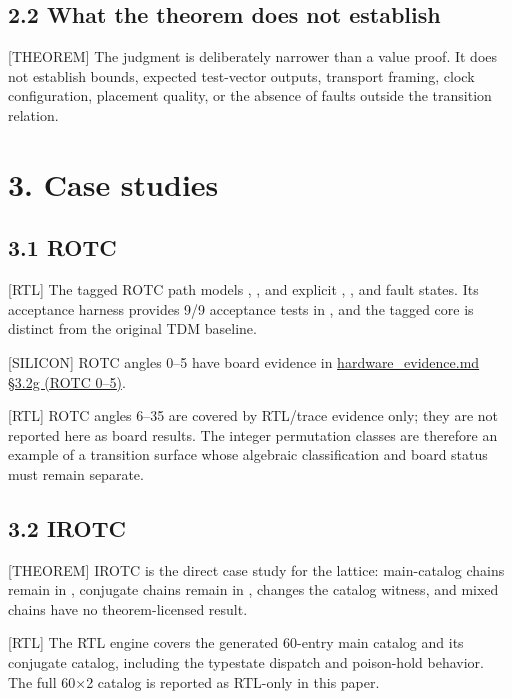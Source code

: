 \documentclass[11pt]{article}
\begin{document}
\subsection{2.2 What the theorem does not establish}

[THEOREM] The judgment is deliberately narrower than a value proof. It does not establish bounds, expected test-vector outputs, transport framing, clock configuration, placement quality, or the absence of faults outside the transition relation.

\section{3. Case studies}

\subsection{3.1 ROTC}

[RTL] The tagged ROTC path models , , and explicit , , and  fault states. Its acceptance harness provides 9/9 acceptance tests in , and the tagged core is distinct from the original TDM baseline.

[SILICON] ROTC angles 0–5 have board evidence in \href{https://github.com/pinnacletechnologysolutionsltd/SPU/blob/v1.2-typestate/docs/hardware_evidence.md#32g-rotc-0-5-silicon-probe}{hardware\_evidence.md §3.2g (ROTC 0–5)}.

[RTL] ROTC angles 6–35 are covered by RTL/trace evidence only; they are not reported here as board results. The integer permutation classes are therefore an example of a transition surface whose algebraic classification and board status must remain separate.

\subsection{3.2 IROTC}

[THEOREM] IROTC is the direct case study for the lattice: main-catalog chains remain in , conjugate chains remain in ,  changes the catalog witness, and mixed chains have no theorem-licensed result.

[RTL] The RTL engine covers the generated 60-entry main catalog and its conjugate catalog, including the typestate dispatch and poison-hold behavior. The full 60×2 catalog is reported as RTL-only in this paper.
\end{document}
